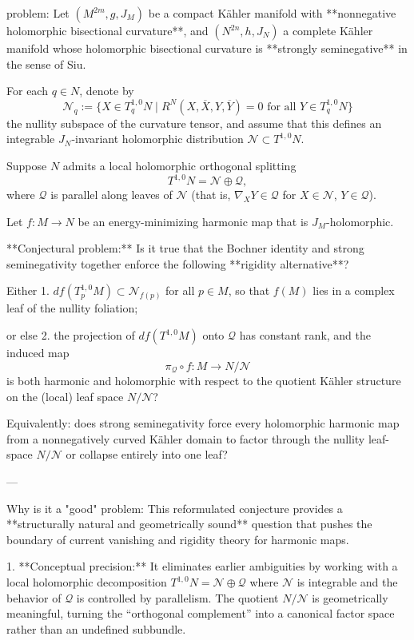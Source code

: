 problem:  
Let \((M^{2m}, g, J_M)\) be a compact Kähler manifold with **nonnegative holomorphic bisectional curvature**, and \((N^{2n}, h, J_N)\) a complete Kähler manifold whose holomorphic bisectional curvature is **strongly seminegative** in the sense of Siu.  

For each \(q \in N\), denote by  
\[
\mathcal{N}_q := \{ X \in T_q^{1,0}N \mid R^N(X,\overline{X},Y,\overline{Y}) = 0 \text{ for all } Y\in T_q^{1,0}N \}
\]
the nullity subspace of the curvature tensor, and assume that this defines an integrable \(J_N\)-invariant holomorphic distribution \(\mathcal{N}\subset T^{1,0}N\).  

Suppose \(N\) admits a local holomorphic orthogonal splitting  
\[
T^{1,0} N = \mathcal{N} \oplus \mathcal{Q},
\]
where \(\mathcal{Q}\) is parallel along leaves of \(\mathcal{N}\) (that is, \(\nabla_X Y \in \mathcal{Q}\) for \(X\in \mathcal{N}\), \(Y\in \mathcal{Q}\)).  

Let \(f:M\to N\) be an energy-minimizing harmonic map that is \(J_M\)-holomorphic.  

**Conjectural problem:**  
Is it true that the Bochner identity and strong seminegativity together enforce the following **rigidity alternative**?

Either  
1. \(df(T_p^{1,0}M)\subset \mathcal{N}_{f(p)}\) for all \(p\in M\),  
so that \(f(M)\) lies in a complex leaf of the nullity foliation;  

or else  
2. the projection of \(df(T^{1,0}M)\) onto \(\mathcal{Q}\) has constant rank, and the induced map  
\[
\pi_\mathcal{Q}\circ f : M \to N/\mathcal{N}
\]
is both harmonic and holomorphic with respect to the quotient Kähler structure on the (local) leaf space \(N/\mathcal{N}\)?  

Equivalently: does strong seminegativity force every holomorphic harmonic map from a nonnegatively curved Kähler domain to factor through the nullity leaf-space \(N/\mathcal{N}\) or collapse entirely into one leaf?

---

Why is it a "good" problem:  
This reformulated conjecture provides a **structurally natural and geometrically sound** question that pushes the boundary of current vanishing and rigidity theory for harmonic maps.  

1. **Conceptual precision:** It eliminates earlier ambiguities by working with a local holomorphic decomposition \(T^{1,0}N=\mathcal{N}\oplus\mathcal{Q}\) where \(\mathcal{N}\) is integrable and the behavior of \(\mathcal{Q}\) is controlled by parallelism. The quotient \(N/\mathcal{N}\) is geometrically meaningful, turning the “orthogonal complement” into a canonical factor space rather than an undefined subbundle.  


